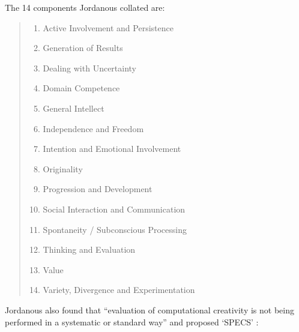 The 14 components Jordanous collated are: \autocite*{Jordanous2012}
\begin{quotation}
  \begin{enumerate}
    \item Active Involvement and Persistence
    \item Generation of Results
    \item Dealing with Uncertainty
    \item Domain Competence
    \item General Intellect
    \item Independence and Freedom
    \item Intention and Emotional Involvement
    \item Originality
    \item Progression and Development
    \item Social Interaction and Communication
    \item Spontaneity / Subconscious Processing
    \item Thinking and Evaluation
    \item Value
    \item Variety, Divergence and Experimentation
  \end{enumerate}
\end{quotation}

Jordanous also found that ``evaluation of computational creativity is not being performed in a systematic or standard way'' \autocite*{Jordanous2011} and proposed `\ac{SPECS}' \autocite*{Jordanous2012a}:

